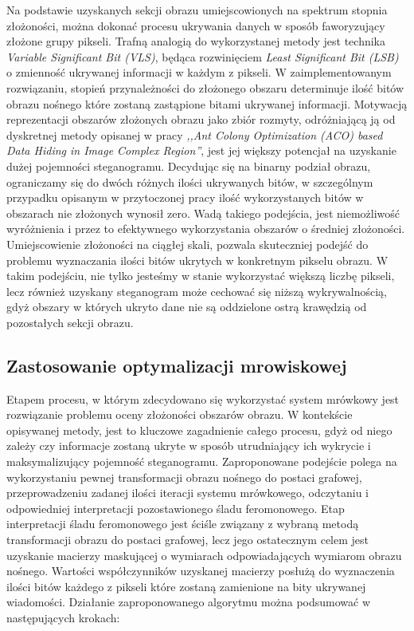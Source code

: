 {{{            %
            Na podstawie uzyskanych sekcji obrazu umiejscowionych na spektrum stopnia złożoności, można dokonać procesu
            ukrywania danych w sposób faworyzujący złożone grupy pikseli. Trafną analogią do wykorzystanej metody jest
            technika \textit{Variable Significant Bit (VLS)}, będąca rozwinięciem \textit{Least Significant Bit (LSB)} o
            zmienność ukrywanej informacji w każdym z pikseli. W zaimplementowanym rozwiązaniu, stopień przynależności
            do złożonego obszaru determinuje ilość bitów obrazu nośnego które zostaną zastąpione bitami ukrywanej
            informacji. Motywacją reprezentacji obszarów złożonych obrazu jako zbiór rozmyty, odróżniającą ją od
            dyskretnej metody opisanej w pracy \textit{,,Ant Colony Optimization (ACO) based Data Hiding in Image
            Complex Region''}\cite{Khan2018AntCO}, jest jej większy potencjał na uzyskanie dużej pojemności
            steganogramu. Decydując się na binarny podział obrazu, ograniczamy się do dwóch różnych ilości ukrywanych
            bitów, w szczególnym przypadku opisanym w przytoczonej pracy ilość wykorzystanych bitów w obszarach nie
            złożonych wynosił zero. Wadą takiego podejścia, jest niemożliwość wyróżnienia i przez to efektywnego
            wykorzystania obszarów o średniej złożoności. Umiejscowienie złożoności na ciągłej skali, pozwala
            skuteczniej podejść do problemu wyznaczania ilości bitów ukrytych w konkretnym pikselu obrazu. W takim
            podejściu, nie tylko jesteśmy w stanie wykorzystać większą liczbę pikseli, lecz również uzyskany steganogram
            może cechować się niższą wykrywalnością, gdyż obszary w których ukryto dane nie są oddzielone ostrą
            krawędzią od pozostałych sekcji obrazu.
        }

        \subsection{Zastosowanie optymalizacji mrowiskowej}
        {
            Etapem procesu, w którym zdecydowano się wykorzystać system mrówkowy jest rozwiązanie problemu oceny
            złożoności obszarów obrazu. W kontekście opisywanej metody, jest to kluczowe zagadnienie całego procesu,
            gdyż od niego zależy czy informacje zostaną ukryte w sposób utrudniający ich wykrycie i maksymalizujący
            pojemność steganogramu. Zaproponowane podejście polega na wykorzystaniu pewnej transformacji obrazu nośnego
            do postaci grafowej, przeprowadzeniu zadanej ilości iteracji systemu mrówkowego, odczytaniu i odpowiedniej
            interpretacji pozostawionego śladu feromonowego. Etap interpretacji śladu feromonowego jest ściśle związany
            z wybraną metodą transformacji obrazu do postaci grafowej, lecz jego ostatecznym celem jest uzyskanie
            macierzy maskującej o wymiarach odpowiadających wymiarom obrazu nośnego. Wartości współczynników uzyskanej
            macierzy posłużą do wyznaczenia ilości bitów każdego z pikseli które zostaną zamienione na bity ukrywanej
            wiadomości. Działanie zaproponowanego algorytmu można podsumować w następujących krokach:

}}}
